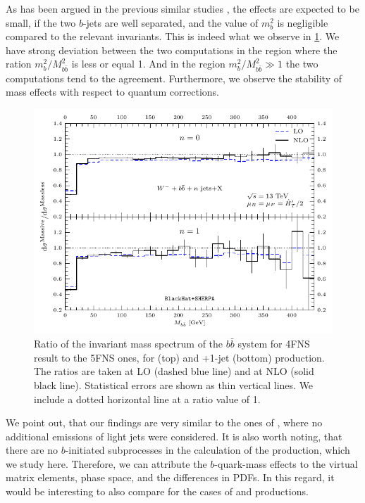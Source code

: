 As has been argued in the previous similar studies \cite{FebresCordero:2006sj},
the effects are expected to be small, if the two $b$-jets are well separated,
and the value of $m_b^2$ is negligible compared to the relevant invariants.
This is indeed what we observe in \cref{fig:ratWmmbb}.
We have strong deviation between the two computations in the region where the ration $m_b^2/M_{b\bar{b}}^2$ 
is less or equal 1. And in the region $m_b^2/M_{b\bar{b}}^2\gg 1$ the two computations tend to the agreement.
Furthermore, we observe the stability of mass effects with respect to quantum corrections. 


\begin{figure}[ht]
  \centering
  \includegraphics[clip,scale=1.0]{plots/crmbb}
  \caption{Ratio of the invariant mass spectrum of the $b\bar b$ system for 4FNS
    result to the 5FNS ones, for \Wbbm{} (top) and \Wbbm+1-jet (bottom) production.
    The ratios are taken at LO (dashed blue line) and at NLO (solid black line).
    Statistical errors are shown as thin vertical lines. We include a dotted
  horizontal line at a ratio value of 1.}
  \label{fig:ratWmmbb}
\end{figure}

We point out, that our findings are very similar to the ones of \cite{FebresCordero:2006sj},
where no additional emissions of light jets were considered.
It is also worth noting, that
there are no $b$-initiated subprocesses in the calculation  of the \Wbbnj[1]{} production,
which we study here.
Therefore, we can attribute the $b$-quark-mass effects to the virtual matrix elements,
phase space, and the differences in PDFs.
In this regard, it would be interesting to also compare for the cases of \Wbbjj{} and \Wbbjjj{}
productions.

